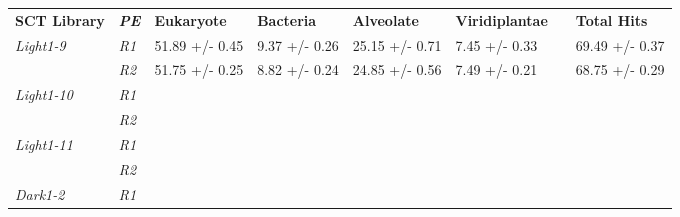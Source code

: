 \begin{table}[h]
\begin{tabular}{@{}|l|l|llllll@{}}
\toprule
\textbf{SCT Library} & \textit{\textbf{PE}} & \multicolumn{1}{l|}{\textbf{Eukaryote}} & \multicolumn{1}{l|}{\textbf{Bacteria}} & \multicolumn{1}{l|}{\textbf{Alveolate}} & \multicolumn{1}{l|}{\textbf{Viridiplantae}} & \multicolumn{1}{l|}{} & \multicolumn{1}{l|}{\textbf{Total Hits}} \\ \cmidrule(r){1-6} \cmidrule(l){8-8} 
\textit{Light1-9}    & \textit{R1}          & \multicolumn{1}{l|}{51.89 +/- 0.45}     & \multicolumn{1}{l|}{9.37 +/- 0.26}     & \multicolumn{1}{l|}{25.15 +/-  0.71}    & \multicolumn{1}{l|}{7.45 +/- 0.33}          & \multicolumn{1}{l|}{} & 69.49 +/- 0.37                           \\ \cmidrule(lr){2-2}
                     & \textit{R2}          & 51.75 +/- 0.25                          & 8.82 +/- 0.24                          & 24.85 +/- 0.56                          & 7.49 +/- 0.21                               &                       & 68.75 +/- 0.29                           \\ \cmidrule(r){1-2}
\textit{Light1-10}   & \textit{R1}          &                                         &                                        &                                         & \multicolumn{1}{l|}{}                       & \multicolumn{1}{l|}{} &                                          \\ \cmidrule(lr){2-2}
                     & \textit{R2}          &                                         &                                        &                                         &                                             &                       &                                          \\ \cmidrule(r){1-2}
\textit{Light1-11}   & \textit{R1}          &                                         &                                        &                                         & \multicolumn{1}{l|}{}                       & \multicolumn{1}{l|}{} &                                          \\ \cmidrule(lr){2-2}
                     & \textit{R2}          &                                         &                                        &                                         &                                             &                       &                                          \\ \cmidrule(r){1-2}
\textit{Dark1-2}     & \textit{R1}          &                                         &                                        &                                         & \multicolumn{1}{l|}{}                       & \multicolumn{1}{l|}{} &                                          \\ \cmidrule(lr){2-2}

\end{tabular}
\end{table}
